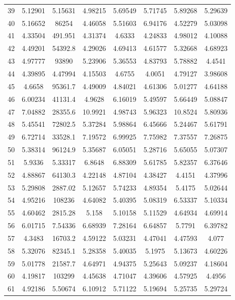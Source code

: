 \begin{center}
\begin{longtable}{cccccccc}
39 & 5.12901 & 5.15631 & 4.98215 & 5.69549 & 5.71745 & 5.89268 & 5.29639\\
40 & 5.16652 & 86254 & 4.46058 & 5.51603 & 6.94176 & 4.52279 & 5.03098\\
41 & 4.33504 & 491.951 & 4.31374 & 4.6333 & 4.24833 & 4.98012 & 4.10088\\
42 & 4.49201 & 54392.8 & 4.29026 & 4.69413 & 4.61577 & 5.32668 & 4.68923\\
43 & 4.97777 & 93890 & 5.23906 & 5.36553 & 4.83793 & 5.78882 & 4.4541\\
44 & 4.39895 & 4.47994 & 4.15503 & 4.6755 & 4.0051 & 4.79127 & 3.98608\\
45 & 4.6658 & 95361.7 & 4.49009 & 4.84021 & 4.61306 & 5.01277 & 4.64188\\
46 & 6.00234 & 41131.4 & 4.9628 & 6.16019 & 5.49597 & 5.66449 & 5.08847\\
47 & 7.04882 & 28355.6 & 10.9921 & 4.98743 & 5.96323 & 10.8524 & 5.80936\\
48 & 5.45541 & 72802.5 & 5.37284 & 5.98864 & 6.45666 & 5.24467 & 5.61791\\
49 & 6.72714 & 33528.1 & 7.19572 & 6.99925 & 7.75982 & 7.37557 & 7.26875\\
50 & 5.38314 & 96124.9 & 5.35687 & 6.05051 & 5.28716 & 5.65055 & 5.07307\\
51 & 5.9336 & 5.33317 & 6.8648 & 6.88309 & 5.61785 & 5.82357 & 6.37646\\
52 & 4.88867 & 64130.3 & 4.22148 & 4.87104 & 4.38427 & 4.4151 & 4.37996\\
53 & 5.29808 & 2887.02 & 5.12657 & 5.74233 & 4.89354 & 5.4175 & 5.02644\\
54 & 4.95216 & 108236 & 4.64082 & 5.40395 & 5.08319 & 6.53337 & 5.10334\\
55 & 4.60462 & 2815.28 & 5.158 & 5.10158 & 5.11529 & 4.64934 & 4.69914\\
56 & 6.01715 & 7.54336 & 6.68939 & 7.28164 & 6.64857 & 5.7791 & 6.39782\\
57 & 4.3483 & 16703.2 & 4.59122 & 5.03231 & 4.47041 & 4.47593 & 4.077\\
58 & 5.32076 & 82345.1 & 5.28358 & 5.40035 & 5.1975 & 5.13673 & 4.60226\\
59 & 5.01778 & 21587.7 & 4.64971 & 4.94375 & 5.25643 & 5.09237 & 4.18604\\
60 & 4.19817 & 103299 & 4.45638 & 4.71047 & 4.39606 & 4.57925 & 4.4956\\
61 & 4.92186 & 5.50674 & 6.10912 & 5.71122 & 5.19694 & 5.25735 & 5.29724\\

\end{longtable}
\end{center}

